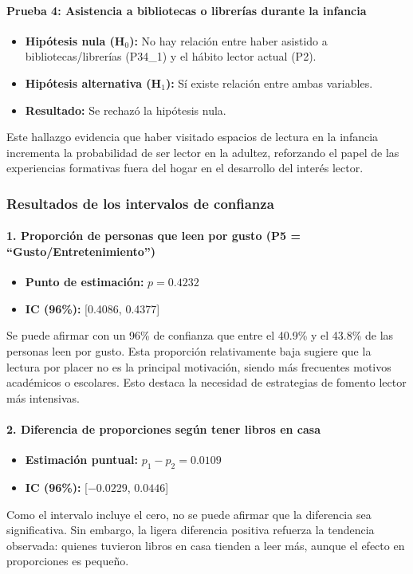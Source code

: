 \documentclass[aps,reprint]{revtex4-2}
\begin{document}
\paragraph{Prueba 4: Asistencia a bibliotecas o librerías durante la infancia}
\begin{itemize}
    \item \textbf{Hipótesis nula (H$_0$):} No hay relación entre haber asistido a bibliotecas/librerías (P34\_1) y el hábito lector actual (P2).
    \item \textbf{Hipótesis alternativa (H$_1$):} Sí existe relación entre ambas variables.
    \item \textbf{Resultado:} Se rechazó la hipótesis nula.
\end{itemize}
Este hallazgo evidencia que haber visitado espacios de lectura en la infancia incrementa la probabilidad de ser lector en la adultez, reforzando el papel de las experiencias formativas fuera del hogar en el desarrollo del interés lector.

\subsubsection*{Resultados de los intervalos de confianza}

\paragraph{1. Proporción de personas que leen por gusto (P5 = “Gusto/Entretenimiento”)}
\begin{itemize}
    \item \textbf{Punto de estimación:} $p = 0.4232$
    \item \textbf{IC (96\%):} [0.4086, 0.4377]
\end{itemize}
Se puede afirmar con un 96\% de confianza que entre el 40.9\% y el 43.8\% de las personas leen por gusto. Esta proporción relativamente baja sugiere que la lectura por placer no es la principal motivación, siendo más frecuentes motivos académicos o escolares. Esto destaca la necesidad de estrategias de fomento lector más intensivas.

\paragraph{2. Diferencia de proporciones según tener libros en casa}
\begin{itemize}
    \item \textbf{Estimación puntual:} $p_1 - p_2 = 0.0109$
    \item \textbf{IC (96\%):} [$-0.0229$, $0.0446$]
\end{itemize}
Como el intervalo incluye el cero, no se puede afirmar que la diferencia sea significativa. Sin embargo, la ligera diferencia positiva refuerza la tendencia observada: quienes tuvieron libros en casa tienden a leer más, aunque el efecto en proporciones es pequeño.
\end{document}
